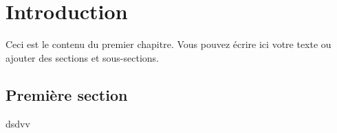 \chapter{Introduction}
Ceci est le contenu du premier chapitre. Vous pouvez écrire ici votre texte ou ajouter des sections et sous-sections.

\section{Première section}
\lipsum[1-5] %
dsdvv